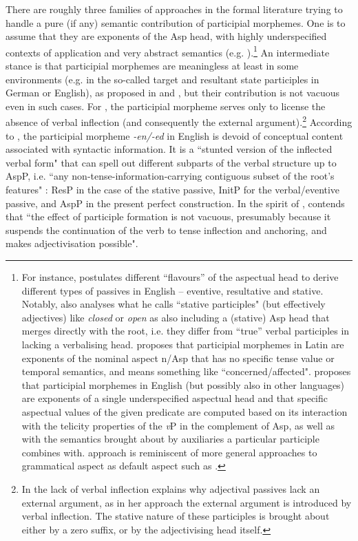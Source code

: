 \documentclass[output=paper,colorlinks,citecolor=brown]{langscibook}
\begin{document}
There are roughly three families of approaches in the formal literature trying to handle a pure (if any) semantic contribution of participial morphemes. One is to assume that they are exponents of the Asp head, with highly underspecified contexts of application and very abstract semantics (e.g. \citealt{Embick2000, sim+:Embick2004, Embick2005, Remberger2012, Wegner2019article, Wegner2021}).\footnote{For instance, \citet{sim+:Embick2004} postulates different ``flavours'' of the aspectual head to derive different types of passives in English -- eventive, resultative and stative. Notably, \citeauthor{sim+:Embick2004} also analyses what he calls ``stative participles" (but effectively adjectives) like \textit{closed} or \textit{open} as also including a (stative) Asp head that merges directly with the root, i.e. they differ from ``true'' verbal participles in lacking a verbalising head. \citet[286]{Remberger2012} proposes that participial morphemes in Latin are exponents of the nominal aspect n/Asp that has no specific tense value or temporal semantics, and means something like ``concerned/affected". \citet{Wegner2019article, Wegner2019book, Wegner2021} proposes that participial morphemes in English (but possibly also in other languages) are exponents of a single underspecified aspectual head and that specific aspectual values of the given predicate are computed based on its interaction with the telicity properties of the \textit{v}P in the complement of Asp, as well as with the semantics brought about by auxiliaries a particular participle combines with.   approach is reminiscent of more general approaches to grammatical aspect as default aspect such as \citet{Bohnemeyer_2004}.} An intermediate stance is that participial morphemes are meaningless at least in some environments (e.g. in the so-called target and resultant state participles in German or English), as proposed in \citet{Kratzer2000} and \citet{ramchand2018}, but their contribution is not vacuous even in such cases. For \citet{Kratzer2000}, the participial morpheme serves only to license the absence of verbal inflection (and consequently the external argument).\footnote{In \citet{Kratzer2000} the lack of verbal inflection explains why adjectival passives lack an external argument, as in her approach the external argument is introduced by verbal inflection. The stative nature of these participles is brought about either by a zero suffix, or by the adjectivising head itself.\label{fn:Kratzer}} According to \citet{ramchand2018}, the participial morpheme \textit{-en/-ed} in English is devoid of conceptual content associated with syntactic information. It is a ``stunted version of the inflected verbal form" \citep[127]{ramchand2018} that can spell out different subparts of the verbal structure up to AspP, i.e. ``any non-tense-information-carrying contiguous subset of the root's features" \citep[81]{ramchand2018}: ResP in the case of the stative passive, InitP for the verbal/eventive passive, and AspP in the present perfect construction. In the spirit of \citet{Kratzer2000}, \citet[92]{ramchand2018} contends that ``the effect of participle formation is not vacuous, presumably because it suspends the continuation of the verb to tense inflection and anchoring, and makes adjectivisation possible". 
\end{document}
